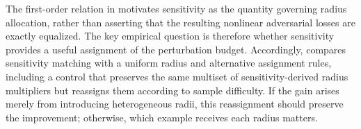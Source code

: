 The first-order relation in  motivates sensitivity as
the quantity governing radius allocation, rather than asserting that the
resulting nonlinear adversarial losses are exactly equalized. The key
empirical question is therefore whether sensitivity provides a useful
assignment of the perturbation budget. Accordingly, 
compares sensitivity matching with a uniform radius and alternative
assignment rules, including a control that preserves the same multiset of
sensitivity-derived radius multipliers but reassigns them according to
sample difficulty. If the gain arises merely from introducing heterogeneous
radii, this reassignment should preserve the improvement; otherwise, which
example receives each radius matters.